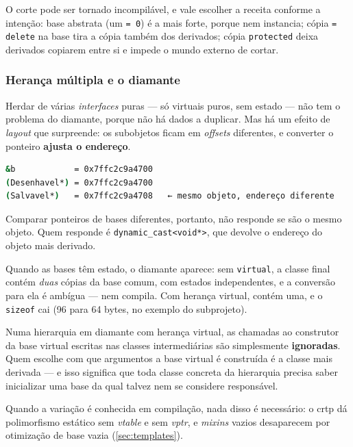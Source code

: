 O corte pode ser tornado incompilável, e vale escolher a receita conforme a
intenção: base abstrata (um \texttt{= 0}) é a mais forte, porque nem instancia;
cópia \texttt{= delete} na base tira a cópia também dos derivados; cópia
\texttt{protected} deixa derivados copiarem entre si e impede o mundo externo de
cortar.

\subsubsection{Herança múltipla e o diamante}

Herdar de várias \emph{interfaces} puras --- só virtuais puros, sem estado ---
não tem o problema do diamante, porque não há dados a duplicar. Mas há um efeito
de \emph{layout} que surpreende: os subobjetos ficam em \emph{offsets}
diferentes, e converter o ponteiro \textbf{ajusta o endereço}.

\begin{lstlisting}[style=bt, language=bash,
    caption={Saída de \texttt{src/oop/}: o mesmo objeto, três endereços.}]
&b            = 0x7ffc2c9a4700
(Desenhavel*) = 0x7ffc2c9a4700
(Salvavel*)   = 0x7ffc2c9a4708   ← mesmo objeto, endereço diferente
\end{lstlisting}

Comparar ponteiros de bases diferentes, portanto, não responde se são o mesmo
objeto. Quem responde é \texttt{dynamic\_cast<void*>}, que devolve o endereço do
objeto mais derivado.

Quando as bases têm estado, o diamante aparece: sem \texttt{virtual}, a classe
final contém \emph{duas} cópias da base comum, com estados independentes, e a
conversão para ela é ambígua --- nem compila. Com herança virtual, contém uma,
e o \texttt{sizeof} cai (96 para 64 bytes, no exemplo do subprojeto).

\begin{armadilha}
Numa hierarquia em diamante com herança virtual, as chamadas ao construtor da
base virtual escritas nas classes intermediárias são simplesmente
\textbf{ignoradas}. Quem escolhe com que argumentos a base virtual é construída
é a classe mais derivada --- e isso significa que toda classe concreta da
hierarquia precisa saber inicializar uma base da qual talvez nem se considere
responsável.
\end{armadilha}

Quando a variação é conhecida em compilação, nada disso é necessário: o
\gls{crtp} dá polimorfismo estático sem \emph{vtable} e sem \emph{vptr}, e
\emph{mixins} vazios desaparecem por otimização de base vazia
(\cref{sec:templates}).

